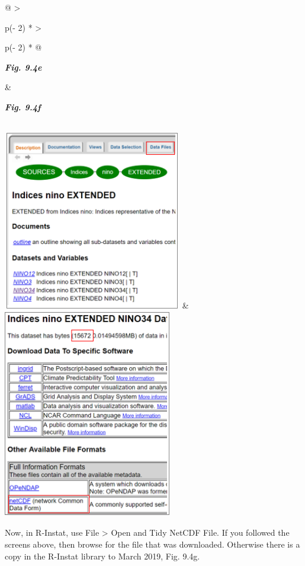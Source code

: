 \documentclass[
  letterpaper,
  DIV=11,
  numbers=noendperiod]{scrreprt}
\begin{document}
\begin{longtable}[]{@{}
  >{\raggedright\arraybackslash}p{(\columnwidth - 2\tabcolsep) * }
  >{\raggedright\arraybackslash}p{(\columnwidth - 2\tabcolsep) * }@{}}
\toprule\noalign{}
\begin{minipage}[b]{\linewidth}\raggedright
\textbf{\emph{Fig. 9.4e}}
\end{minipage} & \begin{minipage}[b]{\linewidth}\raggedright
\textbf{\emph{Fig. 9.4f}}
\end{minipage} \\
\midrule\noalign{}
\endhead
\bottomrule\noalign{}
\endlastfoot
\includegraphics[width=3.07506in,height=3.07958in]{figures/Fig9.4e.png}
&
\includegraphics[width=2.8994in,height=3.59878in]{figures/Fig9.4f.png} \\
\end{longtable}

Now, in R-Instat, use File \textgreater{} Open and Tidy NetCDF File. If
you followed the screens above, then browse for the file that was
downloaded. Otherwise there is a copy in the R-Instat library to March
2019, Fig. 9.4g.
\end{document}
